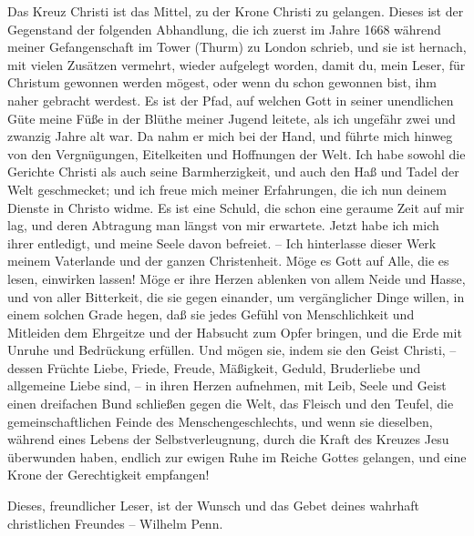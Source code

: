 Das Kreuz Christi ist das Mittel, zu der Krone Christi zu gelangen. Dieses ist der Gegenstand der folgenden Abhandlung, die ich zuerst im Jahre 1668 während meiner Gefangenschaft im Tower (Thurm) zu London schrieb, und sie ist hernach, mit vielen Zusätzen vermehrt, wieder aufgelegt worden, damit du, mein Leser, für Christum gewonnen werden mögest, oder wenn du schon gewonnen bist, ihm naher gebracht werdest. Es ist der Pfad, auf welchen Gott in seiner unendlichen Güte meine Füße in der Blüthe meiner Jugend leitete, als ich ungefähr zwei und zwanzig Jahre alt war. Da nahm er mich bei der Hand, und führte mich hinweg von den Vergnügungen, Eitelkeiten und Hoffnungen der Welt. Ich habe sowohl die Gerichte Christi als auch seine Barmherzigkeit, und auch den Haß und Tadel der Welt geschmecket; und ich freue mich meiner Erfahrungen, die ich nun deinem Dienste in Christo widme. Es ist eine Schuld, die schon eine geraume Zeit auf mir lag, und deren Abtragung man längst von mir erwartete. Jetzt habe ich mich ihrer entledigt, und meine Seele davon befreiet. – Ich hinterlasse dieser Werk meinem Vaterlande und der ganzen Christenheit. Möge es Gott auf Alle, die es lesen, einwirken lassen! Möge er ihre Herzen ablenken von allem Neide und Hasse, und von aller Bitterkeit, die sie gegen einander, um vergänglicher Dinge willen, in einem solchen Grade hegen, daß sie jedes Gefühl von Menschlichkeit und Mitleiden dem Ehrgeitze und der Habsucht zum Opfer bringen, und die Erde mit Unruhe und Bedrückung erfüllen. Und mögen sie, indem sie den Geist Christi, – dessen Früchte Liebe, Friede, Freude, Mäßigkeit, Geduld, Bruderliebe und allgemeine Liebe sind, – in ihren Herzen aufnehmen, mit Leib, Seele und Geist einen dreifachen Bund schließen gegen die Welt, das Fleisch und den Teufel, die gemeinschaftlichen Feinde des Menschengeschlechts, und wenn sie dieselben, während eines Lebens der Selbstverleugnung, durch die Kraft des Kreuzes Jesu überwunden haben, endlich zur ewigen Ruhe im Reiche Gottes gelangen, und eine Krone der Gerechtigkeit empfangen!

Dieses, freundlicher Leser, ist der Wunsch und das Gebet deines wahrhaft christlichen Freundes -- Wilhelm Penn.